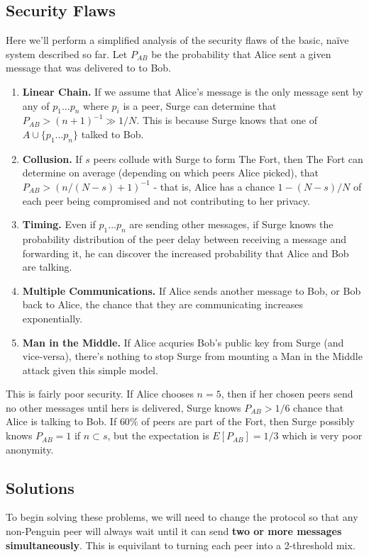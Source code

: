 \documentclass[twocolumn,11pt,english]{paper}
\begin{document}
\subsection{Security Flaws}
Here we'll perform a simplified analysis of the security flaws of the basic, na\"ive system described so far. 
Let $P_{AB}$ be the probability that Alice sent a given message that was delivered to to Bob. 
\begin{enumerate}
\item\textbf{Linear Chain.} If we assume that Alice's message is the only message sent by any of $p_1 \ldots p_n$ where $p_i$ is a peer, Surge can determine that $P_{AB} > (n+1)^{-1} \gg 1/N$. This is because Surge knows that one of $A \cup \{p_1 \ldots p_n\}$ talked to Bob.
\item\textbf{Collusion.} If $s$ peers collude with Surge to form The Fort, then The Fort can determine on average (depending on which peers Alice picked), that $P_{AB} > (n/(N-s)+1)^{-1}$ - that is, Alice has a chance $1 - (N-s)/N$ of each peer being compromised and not contributing to her privacy.
\item\textbf{Timing.} Even if $p_1 ... p_n$ are sending other messages, if Surge knows the probability distribution of the peer delay between receiving a message and forwarding it, he can discover the increased probability that Alice and Bob are talking. 
\item\textbf{Multiple Communications.} If Alice sends another message to Bob, or Bob back to Alice, the chance that they are communicating increases exponentially. 
\item\textbf{Man in the Middle.} If Alice acquries Bob's public key from Surge (and vice-versa), there's nothing to stop Surge from mounting a Man in the Middle attack given this simple model. 
\end{enumerate}
This is fairly poor security. If Alice chooses $n = 5$, then if her chosen peers send no other messages until hers is delivered, Surge knows $P_{AB} > 1/6$ chance that Alice is talking to Bob. If $60\%$ of peers are part of the Fort, then Surge possibly knows $P_{AB} = 1$ if $n \subset s$, but the expectation is $E[P_{AB}] = 1/3$ which is very poor anonymity.

\subsection{Solutions}
To begin solving these problems, we will need to change the protocol so that any non-Penguin peer will always wait until it can send \textbf{two or more messages simultaneously}. This is equivilant to turning each peer into a 2-threshold mix. \cite{TODO}
\end{document}
